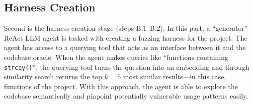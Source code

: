 \documentclass[
  a4paper,
]{scrreprt}
\newenvironment{Shaded}{\begin{snugshade}}{\end{snugshade}}
\newcommand{\ControlFlowTok}[1]{\textcolor[rgb]{0.85,0.12,0.09}{#1}}
\newcommand{\DataTypeTok}[1]{\textcolor[rgb]{0.47,0.16,0.63}{#1}}
\newcommand{\DecValTok}[1]{\textcolor[rgb]{0.47,0.16,0.63}{#1}}
\newcommand{\KeywordTok}[1]{\textcolor[rgb]{0.85,0.12,0.09}{#1}}
\newcommand{\NormalTok}[1]{\textcolor[rgb]{0.33,0.33,0.33}{#1}}
\newcommand{\OperatorTok}[1]{\textcolor[rgb]{0.00,0.46,0.62}{#1}}
\theoremstyle{definition}
\theoremstyle{remark}
\begin{document}
%

\subsection{Harness Creation}\label{sec-creation}

Second is the harness creation stage (steps B.1--B.2). In this part, a
``generator'' ReAct LLM agent is tasked with creating a fuzzing harness
for the project. The agent has access to a querying tool that acts as an
interface between it and the codebase oracle. When the agent makes
queries like ``functions containing \texttt{strcpy()}'', the querying
tool turns the question into an embedding and through similarity search
returns the top \(k=5\) most similar results---in this case, functions
of the project. With this approach, the agent is able to explore the
codebase semantically and pinpoint potentially vulnerable usage patterns
easily.
\end{document}
